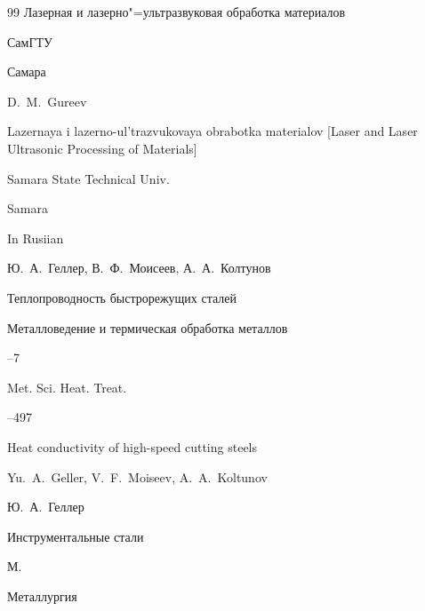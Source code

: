 \begin{thebibliography}{99}
\book Лазерная и лазерно"=ультразвуковая обработка материалов


\publ \mbox{СамГТУ}

\publaddr Самара


\misctransl

\by D.~M.~Gureev

\book Lazernaya i lazerno-ul'trazvukovaya obrabotka materialov \rm [Laser and Laser Ultrasonic Processing of Materials]


\publ Samara State Technical Univ.

\publaddr Samara


\lang In Rusiian






\by Ю.~А.~Геллер, В.~Ф.~Моисеев, А.~А.~Колтунов

\paper Теплопроводность быстрорежущих сталей

\jour Металловедение и термическая обработка металлов



--7

\transl 

\jour Met. Sci. Heat. Treat.




--497

\paper Heat conductivity of high-speed cutting steels

\by Yu.~A.~Geller, V.~F.~Moiseev, A.~A.~Koltunov 







\by Ю.~А.~Геллер

\book Инструментальные стали

\publaddr М.

\publ Металлургия



\misctransl


\end{thebibliography}
